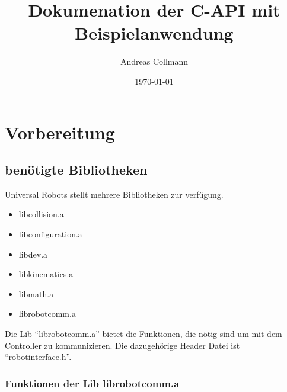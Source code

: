 \documentclass[
a4paper,
12pt,
oneside,
headsepline,		%
footsepline,		%
]{scrbook}
\title{Dokumenation der C-API mit Beispielanwendung}
\author{Andreas Collmann}
\date{\today}
\begin{document}
\chapter{Vorbereitung}

\section{benötigte Bibliotheken}

Universal Robots stellt mehrere Bibliotheken zur verfügung. 

\begin{itemize}
\item libcollision.a
\item libconfiguration.a
\item libdev.a
\item libkinematics.a
\item libmath.a
\item librobotcomm.a
\end{itemize}

Die Lib ``librobotcomm.a'' bietet die Funktionen, die nötig sind um mit dem Controller zu kommunizieren. Die dazugehörige Header Datei ist 
``robotinterface.h''.

\subsection{Funktionen der Lib librobotcomm.a}
\end{document}
